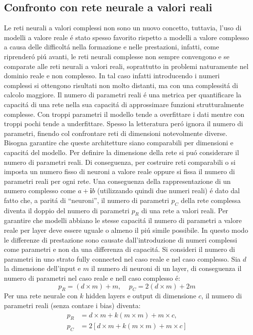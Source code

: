 \documentclass[a4paper,10pt]{article}
\begin{document}
 \subsection{Confronto con rete neurale a valori reali}
 
 Le reti neurali a valori complessi non sono un nuovo concetto, tuttavia, l'uso di modelli a valore reale \'e stato spesso favorito rispetto a modelli a valore complesso a causa delle difficolt\'a nella formazione e nelle prestazioni, infatti, come riprender\'o pi\'u avanti, le reti neurali complesse non sempre convengono e se comparate alle reti neurali a valori reali, soprattutto in problemi naturamente nel dominio reale e non complesso. In tal caso infatti introducendo i numeri complessi si ottengono risultati non molto distanti, ma con una complessit\'a di calcolo maggiore. 
 Il numero di parametri reali \'e una metrica per quantificare la capacit\'a di una rete nella sua capacit\'a di approssimare funzioni strutturalmente complesse. Con troppi parametri il modello tende a overfittare i dati mentre con troppi pochi tende a underfittare. Spesso la letteratura per\'o ignora il numero di parametri, finendo col confrontare reti di dimensioni notevolmente diverse.  Bisogna garantire che queste architetture siano comparabili per dimensioni e capacit\'a del modello. Per definire la dimensione della rete si pu\'o considerare il numero di parametri reali. Di conseguenza, per costruire reti comparabili o si imposta un numero fisso di neuroni a valore reale oppure si fissa il numero di parametri reali per ogni rete.
 Una conseguenza della rappresentazione di un numero complesso come $a+\textbf{i}b$ (utilizzando quindi due numeri reali) \'e dato dal fatto che, a parit\'a di ``neuroni'', il numero di parametri $p_C$ della rete complessa diventa il doppio del numero di parametri $p_R$ di una rete a valori reali. Per garantire che  modelli abbiano le stesse capacit\'a il numero di parametri a valore reale per layer deve essere uguale o almeno il pi\'u simile possibile. In questo modo le differenze di prestazione sono causate dall'introduzione di numeri complessi come parametri e non da una differenza di capacit\'a. 
 Si consideri il numero di parametri in uno strato fully connected nel caso reale e nel caso complesso. Sia $d$ la dimensione dell'input e $m$ il numero di neuroni di un layer, di conseguenza il numero di parametri nel caso reale e nell caso complesso \'e:
 \begin{equation}
  p_R = (d \times m) + m, \;\;\;\; p_C = 2(d \times m) + 2m
 \end{equation}
 Per una rete neurale con $k$ hidden layers e output di dimensione $c$, il numero di parametri reali (senza contare i bias) diventa:
 \begin{align}
  p_R &= d \times m + k(m \times m) + m \times c, \\
  p_C &= 2\left[ d \times m + k(m \times m) + m \times c \right]
 \end{align}
 
\end{document}
